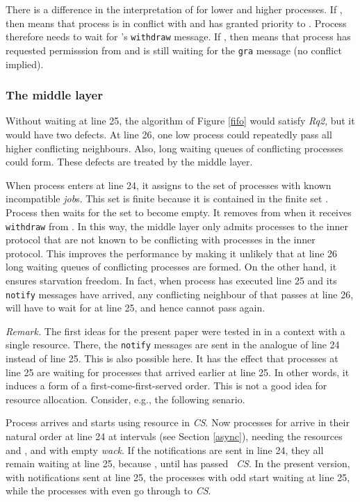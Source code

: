 \documentclass[10pt]{article} \usepackage[english]{babel}
\newenvironment{remark}{\medbreak\noindent\emph{Remark.}}{\boks}
\def\boks  {\mbox{}}
\def\S #1/{\mbox {\textsl{#1}}}
\def\T #1/{\mbox {\texttt{#1}}}
\begin{document}
There is a difference in the interpretation of  for lower
and higher processes. If , then  means that
process  is in conflict with  and has granted priority to
. Process  therefore needs to wait for 's \T withdraw/
message. If , then  means that process  has
requested permisssion from  and is still waiting for the \T gra/
message (no conflict implied).

\subsubsection{The middle layer} \label{middle}

Without waiting at line 25, the algorithm of Figure \ref{fifo} would
satisfy \S Rq2/, but it would have two defects. At line 26, one low
process could repeatedly pass all higher conflicting neighbours. Also,
long waiting queues of conflicting processes could form.  These
defects are treated by the middle layer.

When process  enters at line 24, it assigns to  the set
of processes with known incompatible \S job/s.  This set is finite
because it is contained in the finite set .  Process  then waits for the set  to
become empty. It removes  from  when it receives \T
withdraw/ from . In this way, the middle layer only admits
processes to the inner protocol that are not known to be conflicting
with processes in the inner protocol.  This improves the performance
by making it unlikely that at line 26 long waiting queues of
conflicting processes are formed. On the other hand, it ensures
starvation freedom. In fact, when process  has executed line 25 and
its \T notify/ messages have arrived, any conflicting neighbour of 
that passes  at line 26, will have to wait for  at line 25, and
hence cannot pass  again.

\begin{remark} 
  The first ideas for the present paper were tested in \cite{whh464}
  in a context with a single resource.  There, the \T notify/ messages
  are sent in the analogue of line 24 instead of line 25. This is also
  possible here. It has the effect that processes at line 25 are
  waiting for processes that arrived earlier at line 25. In other
  words, it induces a form of a first-come-first-served order. This is
  not a good idea for resource allocation. Consider, e.g., the
  following senario.

  Process  arrives and starts using resource  in \S CS/. Now
  processes  for  arrive in their natural order at line
  24 at intervals  (see Section \ref{async}), needing the
  resources  and , and with empty \S wack/. If the
  notifications are sent in line 24, they all remain waiting at line
  25, because , until  has passed \S
  CS/. In the present version, with notifications sent at line 25, the
  processes with  odd start waiting at line 25, while the processes
  with  even go through to \S CS/.
\end{remark}
\end{document}
